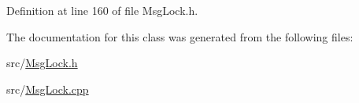 \-Definition at line 160 of file \-Msg\-Lock.\-h.



\-The documentation for this class was generated from the following files\-:\begin{DoxyCompactItemize}
\item 
src/\hyperlink{MsgLock_8h}{\-Msg\-Lock.\-h}\item 
src/\hyperlink{MsgLock_8cpp}{\-Msg\-Lock.\-cpp}\end{DoxyCompactItemize}
